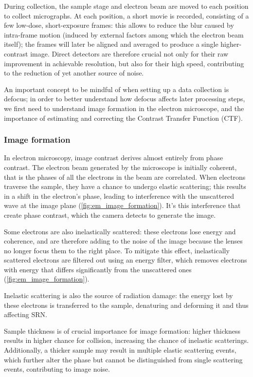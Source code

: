 During collection, the sample stage and electron beam are moved to each position to collect micrographs.
At each position, a short movie is recorded, consisting of a few low-dose, short-exposure frames: this allows to reduce the blur caused by intra-frame motion (induced by external factors among which the electron beam itself); the frames will later be aligned and averaged to produce a single higher-contrast image.
Direct detectors are therefore crucial not only for their raw improvement in achievable resolution, but also for their high speed, contributing to the reduction of yet another source of noise.

An important concept to be mindful of when setting up a data collection is defocus; in order to better understand how defocus affects later processing steps, we first need to understand image formation in the electron microscope, and the importance of estimating and correcting the Contrast Transfer Function (CTF).

\subsubsection{Image formation}

In electron microscopy, image contrast derives almost entirely from phase contrast.
The electron beam generated by the microscope is initially coherent, that is the phases of all the electrons in the beam are correlated.
When electrons traverse the sample, they have a chance to undergo elastic scattering; this results in a shift in the electron's phase, leading to interference with the unscattered wave at the image plane (\autoref{fig:em_image_formation}).
It's this interference that create phase contrast, which the camera detects to generate the image.

Some electrons are also inelastically scattered: these electrons lose energy and coherence, and are therefore adding to the noise of the image because the lenses no longer focus them to the right place.
To mitigate this effect, inelastically scattered electrons are filtered out using an energy filter, which removes electrons with energy that differs significantly from the unscattered ones (\autoref{fig:em_image_formation}).

Inelastic scattering is also the source of radiation damage: the energy lost by these electrons is transferred to the sample, denaturing and deforming it and thus affecting SRN.

Sample thickness is of crucial importance for image formation: higher thickness results in higher chance for collision, increasing the chance of inelastic scatterings.
Additionally, a thicker sample may result in multiple elastic scattering events, which further alter the phase but cannot be distinguished from single scattering events, contributing to image noise.

